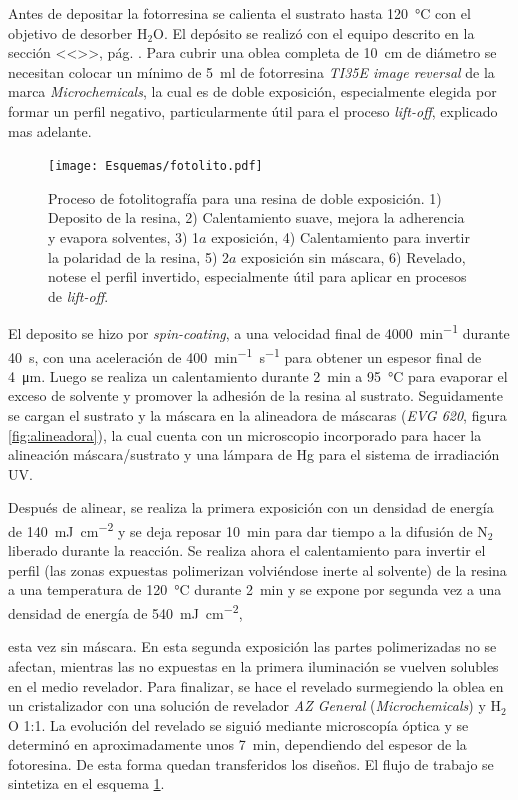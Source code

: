 		Antes de depositar la fotorresina se calienta el sustrato hasta \SI{120}{\celsius} con el objetivo de desorber H$_2$O. El depósito se realizó con el equipo descrito en la sección <<>>, pág. \pageref{sec:deposito_pdm}. Para cubrir una oblea completa de \SI{10}{\cm} de diámetro se necesitan colocar un mínimo de \SI{5}{\ml} de fotorresina \textit{TI35E image reversal} de la marca \textit{Microchemicals}, la cual es de doble exposición, especialmente elegida por formar un perfil negativo, particularmente útil para el proceso \textit{lift-off}, explicado mas adelante.\cite{MicrochemicalsTeam2009} 
			  \begin{figure}[ht]
			  \begin{center}
			  \texttt{[image: Esquemas/fotolito.pdf]}
			  \caption[Esquema fotolitografía]{Proceso de fotolitografía para una resina de doble exposición. 1) Deposito de la resina, 2) Calentamiento suave, mejora la adherencia y evapora solventes, 3) 1$a$ exposición, 4) Calentamiento para invertir la polaridad de la resina, 5) 2$a$ exposición sin máscara, 6) Revelado, notese el perfil invertido, especialmente útil para aplicar en procesos de\textit{ lift-off}.}
			  \label{esq:fotolito}
			  \end{center}
			  \end{figure}			  
		El deposito se hizo por \textit{spin-coating}, a una velocidad final de \SI{4000}{\minute^{-1}} durante \SI{40}{\second}, con una aceleración de \SI{400}{\minute^{-1}.\second^{-1}} para obtener un espesor final de \SI{4}{\um}. Luego se realiza un calentamiento durante \SI{2}{\minute} a \SI{95}{\celsius} para evaporar el exceso de solvente y promover la adhesión de la resina al sustrato. Seguidamente se cargan el sustrato y la máscara en la alineadora de máscaras (\textit{EVG 620}, figura \ref{fig:alineadora}), la cual cuenta con un microscopio incorporado para hacer la alineación máscara/sustrato y una lámpara de Hg para el sistema de irradiación UV. 

		Después de alinear, se realiza la primera exposición con un densidad de energía de \SI{140}{mJ.\cm^{-2}} y se deja reposar \SI{10}{\minute} para dar tiempo a la difusión de N$_2$ liberado durante la reacción. Se realiza ahora el calentamiento para invertir el perfil (las zonas expuestas polimerizan volviéndose inerte al solvente) de la resina a una temperatura de \SI{120}{\celsius} durante \SI{2}{\minute}  y se expone por segunda vez a una densidad de energía de \SI{540}{mJ.cm^{-2}},
		
		esta vez sin máscara. En esta segunda exposición las partes polimerizadas no se afectan, mientras las no expuestas en la primera iluminación se vuelven solubles en el medio revelador. Para finalizar, se hace el revelado surmegiendo la oblea en un cristalizador con una solución de revelador \textit{AZ General} (\textit{Microchemicals}) y H$_2$O 1:1. La evolución del revelado se siguió mediante microscopía óptica y se determinó en aproximadamente unos \SI{7}{\minute}, dependiendo del espesor de la fotoresina. De esta forma quedan transferidos los diseños. El flujo de trabajo se sintetiza en el esquema \ref{esq:fotolito}.

